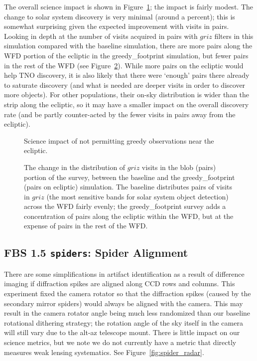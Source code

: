 The overall science impact is shown in Figure~\ref{fig:greedy_radar}; the impact is fairly modest. The change to solar system discovery is very minimal (around a percent); this is somewhat surprising given the expected improvement with visits in pairs. Looking in depth at the number of visits acquired in pairs with $griz$ filters in this simulation compared with the baseline simulation, there are more pairs along the WFD portion of the ecliptic in the greedy\_footprint simulation, but fewer pairs in the rest of the WFD (see Figure~\ref{fig:greedy_nvisits}). While more pairs on the ecliptic would help TNO discovery, it is also likely that there were `enough' pairs there already to saturate discovery (and what is needed are deeper visits in order to discover more objects). For other populations, their on-sky distribution is wider than the strip along the ecliptic, so it may have a smaller impact on the overall discovery rate (and be partly counter-acted by the fewer visits in pairs away from the ecliptic). 

\begin{figure}
\caption{Science impact of not permitting greedy observations near the ecliptic. }
\label{fig:greedy_radar}
\end{figure}

\begin{figure}
\caption{The change in the distribution of $griz$  visits in the blob (pairs) portion of the survey, between the baseline and the greedy\_footprint (pairs on ecliptic) simulation. The baseline distributes pairs of visits in $griz$ (the most sensitive bands for solar system object detection) across the WFD fairly evenly; the greedy\_footprint survey adds a concentration of pairs along the ecliptic within the WFD, but at the expense of pairs in the rest of the WFD.}
\label{fig:greedy_nvisits}
\end{figure}

\subsection{FBS 1.5 {\tt spiders}: Spider Alignment}

There are some simplifications in artifact identification as a result of difference imaging if diffraction spikes are aligned along CCD rows and columns. This experiment fixed the camera rotator so that the diffraction spikes (caused by the secondary mirror spiders) would always be aligned with the camera. This may result in the camera rotator angle being much less randomized than our baseline rotational dithering strategy; the rotation angle of the sky itself in the camera will still vary due to the alt-az telescope mount. There is little impact on our science metrics, but we note we do not currently have a metric that directly measures weak lensing systematics. See Figure~\ref{fig:spider_radar}. 

